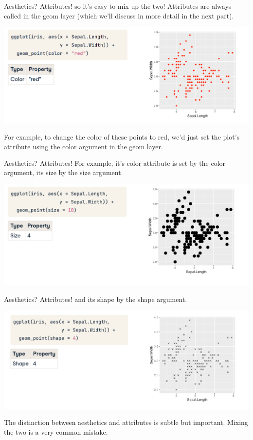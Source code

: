\documentclass[
  ignorenonframetext,
]{beamer}
\begin{document}
\begin{frame}{Aesthetics? Attributes!}
\label{aesthetics-attributes}
so it's easy to mix up the two! Attributes are always called in the geom
layer (which we'll discuss in more detail in the next part).

\includegraphics{../images/im147.png}

For example, to change the color of these points to red, we'd just set
the plot's attribute using the color argument in the geom layer.
\end{frame}

\begin{frame}{Aesthetics? Attributes!}
\label{aesthetics-attributes-1}
For example, it's color attribute is set by the color argument, its size
by the size argument

\includegraphics{../images/im149.png}
\end{frame}

\begin{frame}{Aesthetics? Attributes!}
\label{aesthetics-attributes-2}
and its shape by the shape argument.

\includegraphics{../images/im150.png}

The distinction between aesthetics and attributes is subtle but
important. Mixing the two is a very common mistake.
\end{frame}
\end{document}
